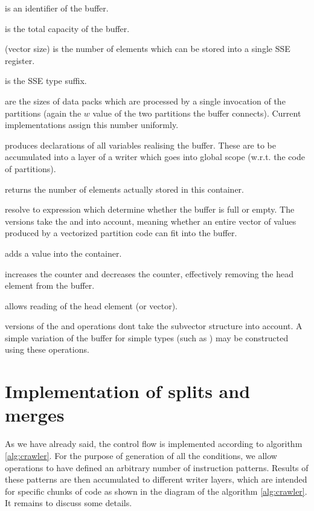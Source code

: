 \begin{description}
  \item {} is an identifier of the buffer.
  \item {} is the total capacity of the buffer.
  \item {} (vector size) is the number of elements which can be stored into a single SSE register.
  \item {} is the SSE type suffix.
  \item {} are the sizes of data packs which are processed by a single invocation of the partitions (again the $w$ value of the two partitions the buffer connects). Current implementations assign this number uniformly.
  \item {} produces declarations of all variables realising the buffer. These are to be accumulated into a layer of a writer which goes into global scope (w.r.t. the code of partitions).
  \item {} returns the number of elements actually stored in this container.
  \item {} resolve to expression which determine whether the buffer is full or empty. The  versions take the  and  into account, meaning whether an entire vector of values produced by a vectorized partition code can fit into the buffer.
  \item {} adds a value into the container.
  \item {} increases the  counter and decreases the  counter, effectively removing the head element from the buffer.
  \item {} allows reading of the head element (or vector).
  \item {} versions of the  and  operations dont take the subvector structure into account. A simple variation of the buffer for simple types (such as ) may be constructed using these operations.
\end{description}

\section{ Implementation of splits and merges }

As we have already said, the control flow is implemented according to algorithm \ref{alg:crawler}. For the purpose of generation of all the conditions, we allow operations to have defined an arbitrary number of instruction patterns. Results of these patterns are then accumulated to different writer layers, which are intended for specific chunks of code as shown in the diagram of the algorithm \ref{alg:crawler}. It remains to discuss some details.

